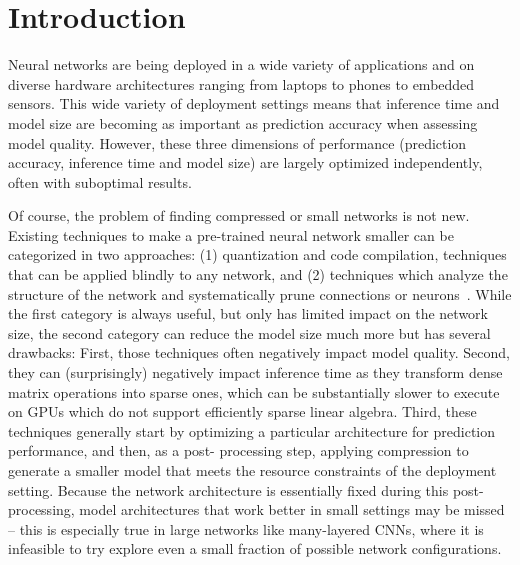 
\section{Introduction}

Neural networks are being deployed in a wide variety of
applications and on diverse hardware architectures ranging from laptops to
phones to embedded sensors. This wide variety of deployment settings means
that inference time and model size are becoming as important as  prediction
accuracy when assessing model quality.  However, these three dimensions of
performance (prediction accuracy, inference time and model size) are largely
optimized independently, often with suboptimal results.

Of course, the problem of finding compressed or small networks is not new.
Existing techniques to make a pre-trained neural network smaller can be
categorized in two approaches: (1) quantization \cite{Jouppi:2017:IPA:3079856.3080246} and code
compilation, techniques that can be applied blindly to
any network, and (2) techniques which analyze the structure of the network and
systematically prune connections or neurons~\cite{han2015deepcompression,Cun}. 
While the first category is always useful, but only
has limited impact on the network size, the second category can reduce the model
size much more but has several drawbacks:   First, those techniques often
negatively impact model quality.  Second, they can (surprisingly) negatively
impact inference time as they transform dense matrix operations into sparse
ones, which can be substantially slower to execute on GPUs which do not support
efficiently sparse linear algebra\cite{han2015deepcompression}. 
Third, these techniques generally start by optimizing a
particular architecture for prediction performance, and then, as a post-
processing step, applying compression  to generate a smaller model that meets
the resource constraints of the deployment setting.  Because the network
architecture is essentially fixed during this post-processing,   model
architectures that work better in small settings may be missed -- this is
especially true in large networks like many-layered CNNs,  where it is
infeasible to try explore even a small fraction of possible network
configurations.


